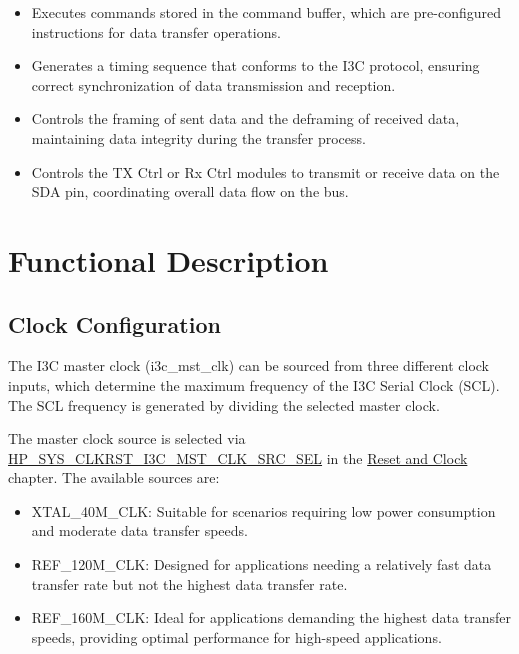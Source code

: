 \documentclass[main\_\_EN.tex]{subfiles}
\begin{document}
\begin{itemize}
    \begin{itemize}
      \item Executes commands stored in the command buffer, which are pre-configured instructions for data transfer operations.
      \item Generates a timing sequence that conforms to the I3C protocol, ensuring correct synchronization of data transmission and reception.
      \item Controls the framing of sent data and the deframing of received data, maintaining data integrity during the transfer process.
      \item Controls the TX Ctrl or Rx Ctrl modules to transmit or receive data on the SDA pin, coordinating overall data flow on the bus.
    \end{itemize}
\end{itemize}




\section{Functional Description}
\label{sec:i3c-func-descr}

\subsection{Clock Configuration}

The I3C master clock (i3c\_mst\_clk) can be sourced from three different clock inputs, which determine the maximum frequency of the I3C Serial Clock (SCL). The SCL frequency is generated by dividing the selected master clock.

The master clock source is selected via \hyperref[fielddesc:HPSYSCLKRSTI3CMSTCLKSRCSEL]{HP\_SYS\_CLKRST\_I3C\_MST\_CLK\_SRC\_SEL} in the \hyperref[mod:resclk]{Reset and Clock} chapter. The available sources are:

\begin{itemize}
    \item XTAL\_40M\_CLK: Suitable for scenarios requiring low power consumption and moderate data transfer speeds.
    \item REF\_120M\_CLK: Designed for applications needing a relatively fast data transfer rate but not the highest data transfer rate.
    \item REF\_160M\_CLK: Ideal for applications demanding the highest data transfer speeds, providing optimal performance for high-speed applications.
\end{itemize}
\end{document}
